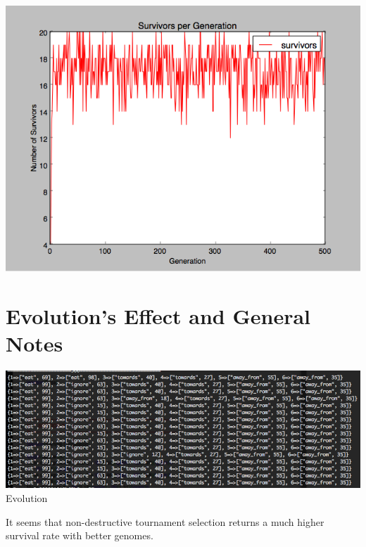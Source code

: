 \documentclass{article}
\begin{document}
\includegraphics[width=1\textwidth]{survivors}




\section{Evolution's Effect and General Notes}

\includegraphics[width=1.35\textwidth,height=1.35\textheight,keepaspectratio]{traits}
Evolution

It seems that non-destructive tournament selection returns a much higher survival rate with better genomes.
\end{document}
